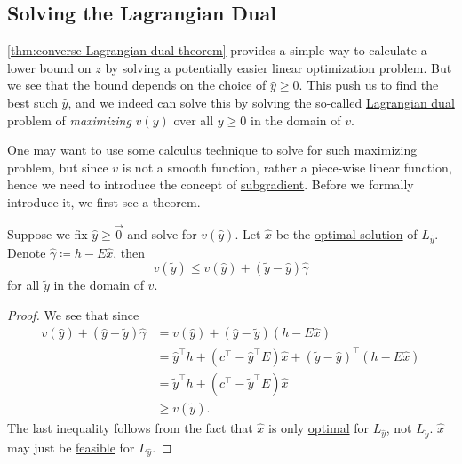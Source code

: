 \subsection{Solving the Lagrangian Dual}
\begin{intuition}
	\autoref{thm:converse-Lagrangian-dual-theorem} provides a simple way to calculate a lower bound on \(z\) by solving a potentially easier linear optimization problem.
	But we see that the bound depends on the choice of \(\hat{y}\geq 0\). This push us to find the best such \(\hat{y}\), and we indeed can solve
	this by solving the so-called \hyperref[def:Lagrangian-dual]{Lagrangian dual} problem of \emph{maximizing} \(v(y)\) over all \(y\geq 0\) in the domain of \(v\).
\end{intuition}

One may want to use some calculus technique to solve for such maximizing problem, but since \(v\) is not a smooth function, rather a piece-wise linear
function, hence we need to introduce the concept of \hyperref[def:subgradient]{subgradient}. Before we formally introduce it, we first see a theorem.

\begin{theorem}\label{thm:lec19-1}
	Suppose we fix \(\hat{y}\geq \vec{0}\) and solve for \(v(\hat{y})\). Let \(\hat{x}\) be the \hyperref[def:optimal-solution]{optimal solution} of \(L_{\hat{y}}\).
	Denote \(\hat{\gamma}\coloneqq h - E \hat{x}\), then
	\[
		v(\widetilde{y})\leq v(\hat{y})+(\widetilde{y} - \hat{y})\hat{\gamma}
	\]
	for all \(\widetilde{y}\) in the domain of \(v\).
	\begin{center}
	\end{center}
\end{theorem}

\begin{proof}
	We see that since
	\[
		\begin{split}
			v(\hat{y})+(\hat{y} - \widetilde{y})\hat{\gamma}&=v(\hat{y})+(\hat{y} - \widetilde{y})(h - E \hat{x})\\
			&= \hat{y}^{\top}h + (c^{\top} - \hat{y}^{\top}E)\hat{x} + (\widetilde{y} - \hat{y})^{\top}(h - E \hat{x})\\
			&= \widetilde{y}^{\top}h + (c^{\top} - \widetilde{y}^{\top} E)\hat{x}\\
			&\geq v(\widetilde{y}).
		\end{split}
	\]
	The last inequality follows from the fact that \(\hat{x}\) is only \hyperref[def:optimal-solution]{optimal} for \(L_{\hat{y}}\), not \(L_{\widetilde{y}}\).
	\(\hat{x}\) may just be \hyperref[def:feasible-solution]{feasible} for \(L_{\hat{y}}\).
\end{proof}

